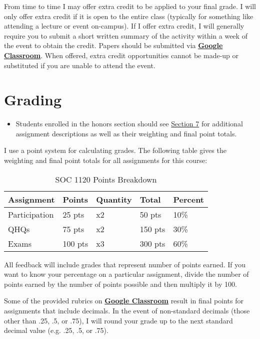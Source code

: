 \documentclass[]{book}
\newenvironment{rmdblock}[1]
  {\begin{shaded*}
  \begin{itemize}
  \renewcommand{\labelitemi}{
    \raisebox{-.7\height}[0pt][0pt]{
      {\setkeys{Gin}{width=3em,keepaspectratio}\texttt{[image: images/\#1]}}
    }
  }
  \item
  }
  {
  \end{itemize}
  \end{shaded*}
  }
\newenvironment{rmdwarning}
  {\begin{rmdblock}{warning}}
  {\end{rmdblock}}
\begin{document}
From time to time I may offer extra credit to be applied to your final grade. I will only offer extra credit if it is open to the entire class (typically for something like attending a lecture or event on-campus). If I offer extra credit, I will generally require you to submit a short written summary of the activity within a week of the event to obtain the credit. Papers should be submitted via \textbf{\href{https://classroom.google.com}{Google Classroom}}. When offered, extra credit opportunities cannot be made-up or substituted if you are unable to attend the event.

\hypertarget{grading}{%
\section{Grading}\label{grading}}

\begin{rmdwarning}
Students enrolled in the honors section should see
\href{/syllabus/honors-overview.html}{Section 7} for additional
assignment descriptions as well as their weighting and final point
totals.
\end{rmdwarning}

I use a point system for calculating grades. The following table gives the weighting and final point totals for all assignments for this course:

\begin{table}[t]

\caption{\label{tab:unnamed-chunk-6}SOC 1120 Points Breakdown}
\centering
\begin{tabular}{lllll}
\toprule
Assignment & Points & Quantity & Total & Percent\\
\midrule
Participation & 25 pts & x2 & 50 pts & 10\%\\
QHQs & 75 pts & x2 & 150 pts & 30\%\\
Exams & 100 pts & x3 & 300 pts & 60\%\\
\bottomrule
\end{tabular}
\end{table}

All feedback will include grades that represent number of points earned. If you want to know your percentage on a particular assignment, divide the number of points earned by the number of points possible and then multiply it by 100.

Some of the provided rubrics on \textbf{\href{https://classroom.google.com}{Google Classroom}} result in final points for assignments that include decimals. In the event of non-standard decimals (those other than .25, .5, or .75), I will round your grade up to the next standard decimal value (e.g. .25, .5, or .75).
\end{document}
